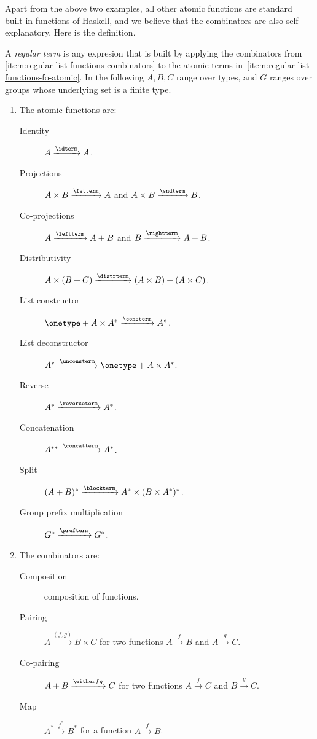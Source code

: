 Apart from the above two examples, all other atomic functions are standard built-in functions of Haskell, and we believe that the combinators are also self-explanatory. Here is the definition.

\begin{definition} \label{def:regular-terms} A \emph{regular term} is any expresion that is built by applying the combinators from \cref{item:regular-list-functions-combinators} to the atomic terms in~\cref{item:regular-list-functions-fo-atomic}. In the following $A,B,C$ range over types, and $G$ ranges over groups whose underlying set is a finite type. 
    \begin{enumerate}
        \item \label{item:regular-list-functions-fo-atomic}     The atomic functions are:
    \begin{description}
        \item[Identity]  $A \xrightarrow {\idterm} A$.
        \item[Projections]  $A \times B \xrightarrow {\fstterm} A$ and $A \times B \xrightarrow {\sndterm} B$.
        \item[Co-projections] $A \xrightarrow {\leftterm} A + B$ and $B \xrightarrow {\rightterm} A + B$.
        \item[Distributivity]  $A \times (B + C) \xrightarrow {\distrterm} (A \times B) + (A \times C)$. 
        \item[List constructor] $\onetype + A \times A^* \xrightarrow {\consterm} A^*$.
        \item[List deconstructor]  $A^* \xrightarrow {\unconsterm} \onetype + A \times A^*$.
        \item[Reverse]  $A^* \xrightarrow{\reverseterm} A^*$.
        \item[Concatenation] $A^{**} \xrightarrow{\concatterm} A^*$.
        \item[Split] $(A+B)^* \xrightarrow{\blockterm} A^* \times (B \times A^*)^*$.
        \item[Group prefix multiplication] $G^* \xrightarrow{\prefterm} G^*$.
    \end{description}
    
            \item \label{item:regular-list-functions-combinators} The combinators are:
    \begin{description}
        \item[Composition] composition of functions.
        \item [Pairing]  $A \xrightarrow{(f,g)} B \times C$ for two functions   $A \xrightarrow f B$ and $A \xrightarrow g C$.
        \item [Co-pairing] $A + B \xrightarrow{\either f g} C$ for two functions  $A \xrightarrow f C$ and $B \xrightarrow g C$.
        \item [Map] $A^* \xrightarrow{f^*} B^*$ for a function $A \xrightarrow f B$.
    \end{description}
        
    \end{enumerate}
\end{definition}

